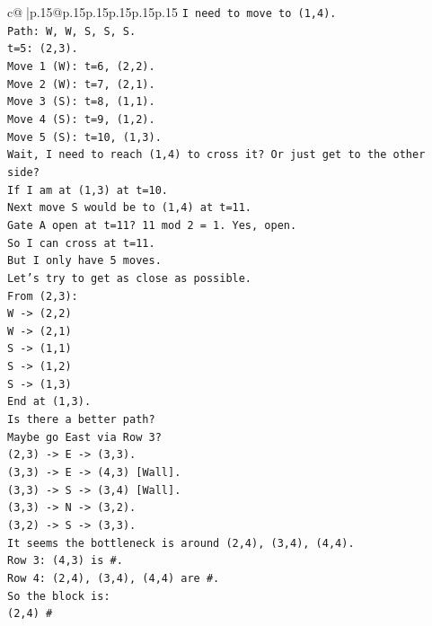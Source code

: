 \documentclass{article}
\begin{document}
{\begin{supertabular}{c@{$\;$}|p{.15\linewidth}@{}p{.15\linewidth}p{.15\linewidth}p{.15\linewidth}p{.15\linewidth}p{.15\linewidth}}
{{{\texttt{I need to move to (1,4).} \\
\texttt{Path: W, W, S, S, S.} \\
\texttt{t=5: (2,3).} \\
\texttt{Move 1 (W): t=6, (2,2).} \\
\texttt{Move 2 (W): t=7, (2,1).} \\
\texttt{Move 3 (S): t=8, (1,1).} \\
\texttt{Move 4 (S): t=9, (1,2).} \\
\texttt{Move 5 (S): t=10, (1,3).} \\
\texttt{Wait, I need to reach (1,4) to cross it? Or just get to the other side?} \\
\texttt{If I am at (1,3) at t=10.} \\
\texttt{Next move S would be to (1,4) at t=11.} \\
\texttt{Gate A open at t=11? 11 mod 2 = 1. Yes, open.} \\
\texttt{So I can cross at t=11.} \\
\texttt{But I only have 5 moves.} \\
\texttt{Let's try to get as close as possible.} \\
\texttt{From (2,3):} \\
\texttt{W {-}> (2,2)} \\
\texttt{W {-}> (2,1)} \\
\texttt{S {-}> (1,1)} \\
\texttt{S {-}> (1,2)} \\
\texttt{S {-}> (1,3)} \\
\texttt{End at (1,3).} \\
\texttt{Is there a better path?} \\
\texttt{Maybe go East via Row 3?} \\
\texttt{(2,3) {-}> E {-}> (3,3).} \\
\texttt{(3,3) {-}> E {-}> (4,3) {[}Wall{]}.} \\
\texttt{(3,3) {-}> S {-}> (3,4) {[}Wall{]}.} \\
\texttt{(3,3) {-}> N {-}> (3,2).} \\
\texttt{(3,2) {-}> S {-}> (3,3).} \\
\texttt{It seems the bottleneck is around (2,4), (3,4), (4,4).} \\
\texttt{Row 3: (4,3) is \#.} \\
\texttt{Row 4: (2,4), (3,4), (4,4) are \#.} \\
\texttt{So the block is:} \\
\texttt{(2,4) \#} \\
}}}
\end{supertabular}}
\end{document}
